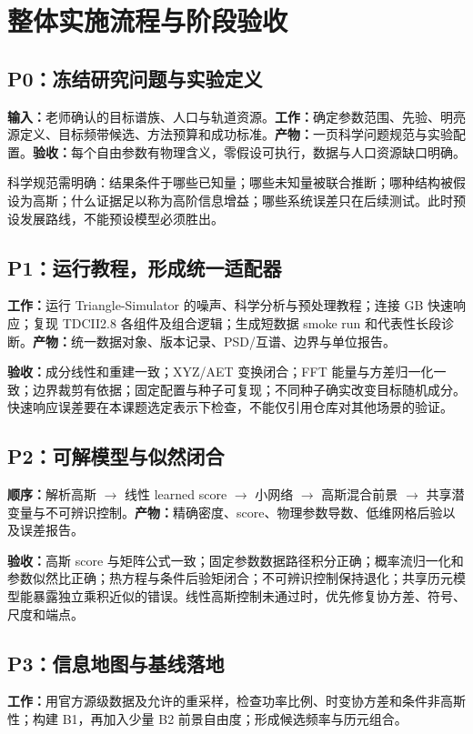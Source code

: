 \documentclass[UTF8,fontset=fandol,a4paper,11pt]{ctexart}
\numberwithin{equation}{section}
\begin{document}
\section{整体实施流程与阶段验收}
\subsection{P0：冻结研究问题与实验定义}
\textbf{输入：}老师确认的目标谱族、人口与轨道资源。\textbf{工作：}确定参数范围、先验、明亮源定义、目标频带候选、方法预算和成功标准。\textbf{产物：}一页科学问题规范与实验配置。\textbf{验收：}每个自由参数有物理含义，零假设可执行，数据与人口资源缺口明确。

科学规范需明确：结果条件于哪些已知量；哪些未知量被联合推断；哪种结构被假设为高斯；什么证据足以称为高阶信息增益；哪些系统误差只在后续测试。此时预设发展路线，不能预设模型必须胜出。

\subsection{P1：运行教程，形成统一适配器}
\textbf{工作：}运行 Triangle-Simulator 的噪声、科学分析与预处理教程；连接 GB 快速响应；复现 TDCII2.8 各组件及组合逻辑；生成短数据 smoke run 和代表性长段诊断。\textbf{产物：}统一数据对象、版本记录、PSD/互谱、边界与单位报告。

\textbf{验收：}成分线性和重建一致；XYZ/AET 变换闭合；FFT 能量与方差归一化一致；边界裁剪有依据；固定配置与种子可复现；不同种子确实改变目标随机成分。快速响应误差要在本课题选定表示下检查，不能仅引用仓库对其他场景的验证。

\subsection{P2：可解模型与似然闭合}
\textbf{顺序：}解析高斯 $\rightarrow$ 线性 learned score $\rightarrow$ 小网络 $\rightarrow$ 高斯混合前景 $\rightarrow$ 共享潜变量与不可辨识控制。\textbf{产物：}精确密度、score、物理参数导数、低维网格后验以及误差报告。

\textbf{验收：}高斯 score 与矩阵公式一致；固定参数数据路径积分正确；概率流归一化和参数似然比正确；热方程与条件后验矩闭合；不可辨识控制保持退化；共享历元模型能暴露独立乘积近似的错误。线性高斯控制未通过时，优先修复协方差、符号、尺度和端点。

\subsection{P3：信息地图与基线落地}
\textbf{工作：}用官方源级数据及允许的重采样，检查功率比例、时变协方差和条件非高斯性；构建 B1，再加入少量 B2 前景自由度；形成候选频率与历元组合。
\end{document}
